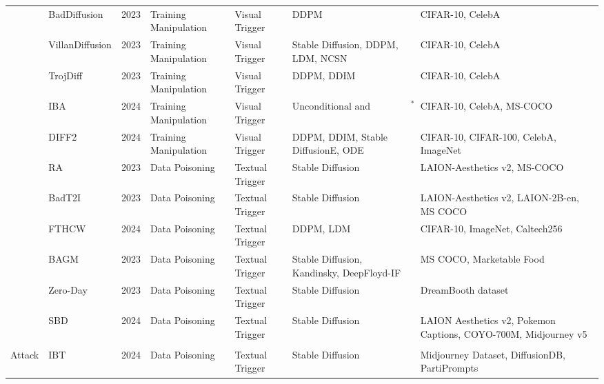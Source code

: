 \begin{table*}[htp]
{\begin{tabular}{p{}p{}p{}p{}p{}p{}p{}}
\cellcolor{white} & {BadDiffusion} \cite{chou2023backdoor} & 2023 & Training Manipulation & Visual Trigger & DDPM & CIFAR-10, CelebA \\ 
\cellcolor{white} & {VillanDiffusion}\cite{chou2024villandiffusion} & 2023 & Training Manipulation & Visual Trigger & Stable Diffusion, DDPM, LDM, NCSN & CIFAR-10, CelebA \\ 
\cellcolor{white} & {TrojDiff}\cite{chen2023trojdiff} & 2023 & Training Manipulation & Visual Trigger & DDPM, DDIM & CIFAR-10, CelebA \\
\cellcolor{white} & {IBA}\cite{li2024invisible} & 2024 & Training Manipulation & Visual Trigger & $\text{Unconditional and Conditional DM}^*$ & CIFAR-10,  CelebA, MS-COCO \\
\cellcolor{white} & {DIFF2}\cite{li2024watch} & 2024 & Training Manipulation & Visual Trigger & DDPM, DDIM, Stable DiffusionE, ODE & CIFAR-10, CIFAR-100, CelebA, ImageNet \\
\cellcolor{white} & {RA}\cite{struppek2023rickrolling} & 2023 & Data Poisoning & Textual Trigger & Stable Diffusion & LAION-Aesthetics v2, MS-COCO \\
\cellcolor{white} & {BadT2I}\cite{zhai2023text} & 2023 & Data Poisoning & Textual Trigger & Stable Diffusion & LAION-Aesthetics v2, LAION-2B-en, MS COCO\\
\cellcolor{white} & {FTHCW}\cite{pan2023trojan} & 2024 & Data Poisoning & Textual Trigger & DDPM, LDM & CIFAR-10, ImageNet, Caltech256 \\
\cellcolor{white} & {BAGM}\cite{vice2024bagm} & 2023 & Data Poisoning & Textual Trigger & Stable Diffusion, Kandinsky, DeepFloyd-IF & MS COCO, Marketable Food \\
\cellcolor{white} & {Zero-Day}\cite{huang2023zero, huang2024personalization} & 2023 & Data Poisoning & Textual Trigger & Stable Diffusion & DreamBooth dataset \\
\cellcolor{white} & {SBD}\cite{wang2024stronger} & 2024 & Data Poisoning & Textual Trigger & Stable Diffusion & LAION Aesthetics v2, Pokemon Captions, COYO-700M, Midjourney v5 \\
\cellcolor{white}\multirow{-13}{0.1\textwidth}{Backdoor \\ Attack} & {IBT} \cite{naseh2024injecting} & 2024 & Data Poisoning & Textual Trigger & Stable Diffusion & Midjourney Dataset, DiffusionDB, PartiPrompts\\
\hline



\end{tabular}}
\end{table*}

